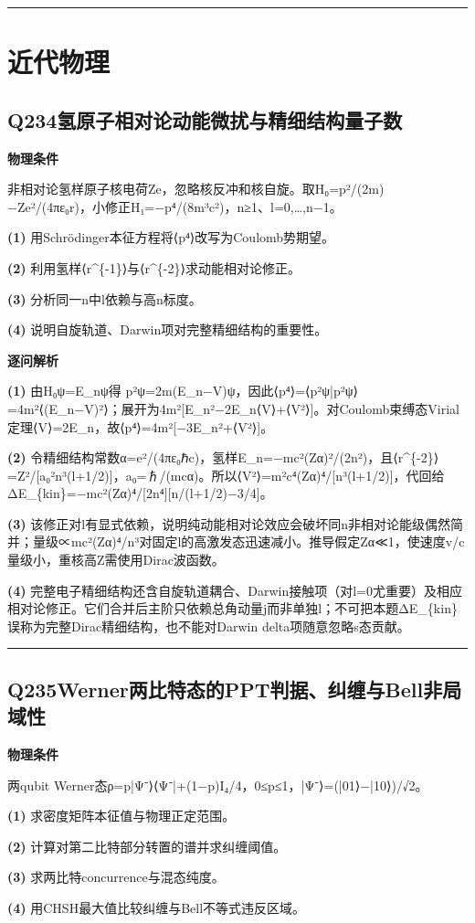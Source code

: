 \documentclass[UTF8,a4paper,11pt,oneside,openany]{ctexbook}
\begin{document}
\par\bigskip\hrule\bigskip
\chapter{近代物理}
\section*{Q234\quad 氢原子相对论动能微扰与精细结构量子数}
\textbf{物理条件}\par 非相对论氢样原子核电荷Ze，忽略核反冲和核自旋。取H₀=p²/(2m)−Ze²/(4πε₀r)，小修正H₁=−p⁴/(8m³c²)，n≥1、l=0,…,n−1。
\par\noindent\textbf{(1)} 用Schrödinger本征方程将⟨p⁴⟩改写为Coulomb势期望。
\par\noindent\textbf{(2)} 利用氢样⟨r\textasciicircum{}\{-1\}⟩与⟨r\textasciicircum{}\{-2\}⟩求动能相对论修正。
\par\noindent\textbf{(3)} 分析同一n中l依赖与高n标度。
\par\noindent\textbf{(4)} 说明自旋轨道、Darwin项对完整精细结构的重要性。

\par\medskip\noindent\textbf{逐问解析}
\par\noindent\textbf{(1)} 由H₀ψ=E\_nψ得 p²ψ=2m(E\_n−V)ψ，因此⟨p⁴⟩=⟨p²ψ|p²ψ⟩=4m²⟨(E\_n−V)²⟩；展开为4m²[E\_n²−2E\_n⟨V⟩+⟨V²⟩]。对Coulomb束缚态Virial定理⟨V⟩=2E\_n，故⟨p⁴⟩=4m²[−3E\_n²+⟨V²⟩]。
\par\noindent\textbf{(2)} 令精细结构常数α=e²/(4πε₀ℏc)，氢样E\_n=−mc²(Zα)²/(2n²)，且⟨r\textasciicircum{}\{-2\}⟩=Z²/[a₀²n³(l+1/2)]，a₀=ℏ/(mcα)。所以⟨V²⟩=m²c⁴(Zα)⁴/[n³(l+1/2)]，代回给 ΔE\_\{kin\}=−mc²(Zα)⁴/[2n⁴][n/(l+1/2)−3/4]。
\par\noindent\textbf{(3)} 该修正对l有显式依赖，说明纯动能相对论效应会破坏同n非相对论能级偶然简并；量级∝mc²(Zα)⁴/n³对固定l的高激发态迅速减小。推导假定Zα≪1，使速度v/c量级小，重核高Z需使用Dirac波函数。
\par\noindent\textbf{(4)} 完整电子精细结构还含自旋轨道耦合、Darwin接触项（对l=0尤重要）及相应相对论修正。它们合并后主阶只依赖总角动量j而非单独l；不可把本题ΔE\_\{kin\}误称为完整Dirac精细结构，也不能对Darwin delta项随意忽略s态贡献。

\par\bigskip\hrule\bigskip
\section*{Q235\quad Werner两比特态的PPT判据、纠缠与Bell非局域性}
\textbf{物理条件}\par 两qubit Werner态ρ=p|Ψ⁻⟩⟨Ψ⁻|+(1−p)I₄/4，0≤p≤1，|Ψ⁻⟩=(|01⟩−|10⟩)/√2。
\par\noindent\textbf{(1)} 求密度矩阵本征值与物理正定范围。
\par\noindent\textbf{(2)} 计算对第二比特部分转置的谱并求纠缠阈值。
\par\noindent\textbf{(3)} 求两比特concurrence与混态纯度。
\par\noindent\textbf{(4)} 用CHSH最大值比较纠缠与Bell不等式违反区域。
\end{document}
